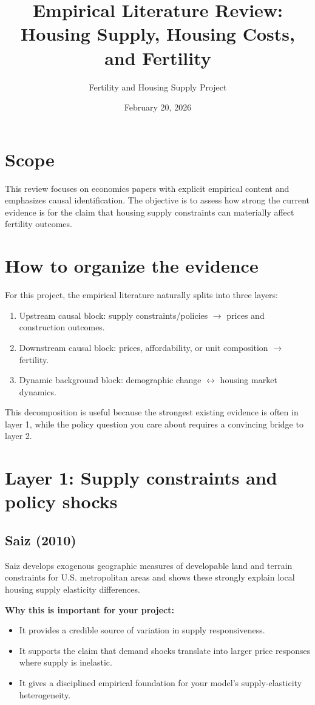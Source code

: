 \documentclass[11pt]{article}
\title{Empirical Literature Review: Housing Supply, Housing Costs, and Fertility}
\author{Fertility and Housing Supply Project}
\date{February 20, 2026}
\begin{document}
\maketitle

\section*{Scope}
This review focuses on economics papers with explicit empirical content and emphasizes causal identification. The objective is to assess how strong the current evidence is for the claim that housing supply constraints can materially affect fertility outcomes.

\section{How to organize the evidence}
For this project, the empirical literature naturally splits into three layers:
\begin{enumerate}
\item Upstream causal block: supply constraints/policies $\rightarrow$ prices and construction outcomes.
\item Downstream causal block: prices, affordability, or unit composition $\rightarrow$ fertility.
\item Dynamic background block: demographic change $\leftrightarrow$ housing market dynamics.
\end{enumerate}

This decomposition is useful because the strongest existing evidence is often in layer 1, while the policy question you care about requires a convincing bridge to layer 2.

\section{Layer 1: Supply constraints and policy shocks}
\subsection*{Saiz (2010)}
Saiz develops exogenous geographic measures of developable land and terrain constraints for U.S. metropolitan areas and shows these strongly explain local housing supply elasticity differences.

\textbf{Why this is important for your project:}
\begin{itemize}
\item It provides a credible source of variation in supply responsiveness.
\item It supports the claim that demand shocks translate into larger price responses where supply is inelastic.
\item It gives a disciplined empirical foundation for your model's supply-elasticity heterogeneity.
\end{itemize}
\end{document}
